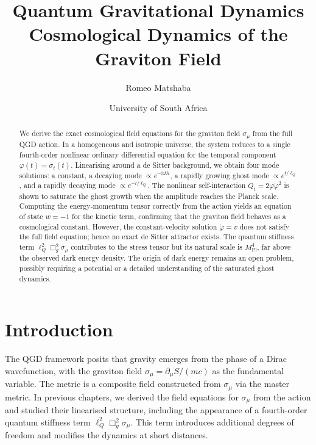 \documentclass[11pt,a4paper]{article}
\title{\textbf{Quantum Gravitational Dynamics}\\[4pt]
\Large Cosmological Dynamics of the Graviton Field}
\author{Romeo Matshaba}
\date{University of South Africa}
\begin{document}
\maketitle

\begin{abstract}
We derive the exact cosmological field equations for the graviton field \(\sigma_\mu\) from the full QGD action. In a homogeneous and isotropic universe, the system reduces to a single fourth‑order nonlinear ordinary differential equation for the temporal component \(\varphi(t)=\sigma_t(t)\). Linearising around a de Sitter background, we obtain four mode solutions: a constant, a decaying mode \(\propto e^{-3Ht}\), a rapidly growing ghost mode \(\propto e^{t/\ell_Q}\), and a rapidly decaying mode \(\propto e^{-t/\ell_Q}\). The nonlinear self‑interaction \(Q_t = 2\varphi\dot\varphi^2\) is shown to saturate the ghost growth when the amplitude reaches the Planck scale. Computing the energy‑momentum tensor correctly from the action yields an equation of state \(w=-1\) for the kinetic term, confirming that the graviton field behaves as a cosmological constant. However, the constant‑velocity solution \(\dot\varphi = v\) does not satisfy the full field equation; hence no exact de Sitter attractor exists. The quantum stiffness term \(\ell_Q^2\Box_g^2\sigma_\mu\) contributes to the stress tensor but its natural scale is \(M_{\mathrm{Pl}}^4\), far above the observed dark energy density. The origin of dark energy remains an open problem, possibly requiring a potential or a detailed understanding of the saturated ghost dynamics.
\end{abstract}

\tableofcontents

\section{Introduction}
\label{sec:intro}

The QGD framework posits that gravity emerges from the phase of a Dirac wavefunction, with the graviton field \(\sigma_\mu = \partial_\mu S/(mc)\) as the fundamental variable. The metric is a composite field constructed from \(\sigma_\mu\) via the master metric. In previous chapters, we derived the field equations for \(\sigma_\mu\) from the action and studied their linearised structure, including the appearance of a fourth‑order quantum stiffness term \(\ell_Q^2\Box_g^2\sigma_\mu\). This term introduces additional degrees of freedom and modifies the dynamics at short distances.
\end{document}

